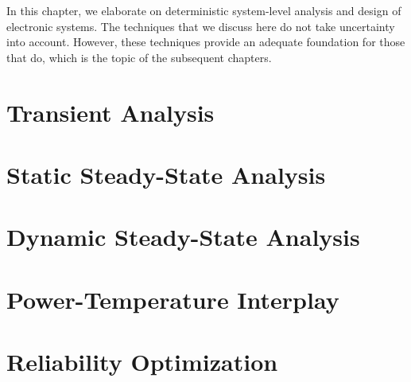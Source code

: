 In this chapter, we elaborate on deterministic system-level analysis and design
of electronic systems. The techniques that we discuss here do not take
uncertainty into account. However, these techniques provide an adequate
foundation for those that do, which is the topic of the subsequent chapters.

\section{\introductiontitle}

\section{Transient Analysis}

\section{Static Steady-State Analysis}

\section{Dynamic Steady-State Analysis}

\section{Power-Temperature Interplay}

\section{Reliability Optimization}

\section{\conclusiontitle}
